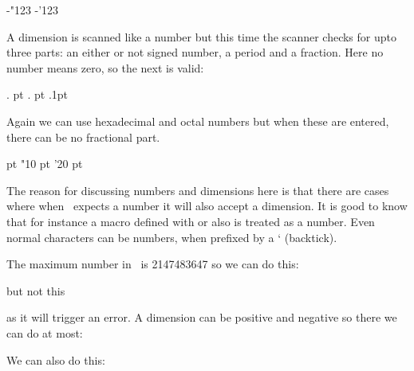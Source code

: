 \startbuffer
{}
\number -"123
\number -'123
\stopbuffer

\typebuffer[option=TEX]

\startlines \getbuffer \stoplines

A dimension is scanned like a number but this time the scanner checks for upto
three parts: an either or not signed number, a period and a fraction. Here no
number means zero, so the next is valid:

\startbuffer
\the\dimexpr  . pt \relax
\the{}. pt \relax
\the\dimexpr  .1pt \relax
\the\dimexpr 1.1pt \relax
\stopbuffer

\typebuffer[option=TEX]

\startlines \getbuffer \stoplines

Again we can use hexadecimal and octal numbers but when these are entered, there
can be no fractional part.

\startbuffer
\the{} pt \relax
\the\dimexpr "10 pt \relax
\the\dimexpr '20 pt \relax
\stopbuffer

\typebuffer[option=TEX]

\startlines \getbuffer \stoplines

The reason for discussing numbers and dimensions here is that there are cases where
when \TEX\ expects a number it will also accept a dimension. It is good to know that
for instance a macro defined with \type {\chardef} or \type {\mathchardef} also is
treated as a number. Even normal characters can be numbers, when prefixed by a \type
{`} (backtick).

The maximum number in \TEX\ is 2147483647 so we can do this:

\starttyping[option=TEX]
\stoptyping

but not this

\starttyping[option=TEX]
\stoptyping

as it will trigger an error. A dimension can be positive and negative so there we
can do at most:

\starttyping[option=TEX]
\scratchdimen  1073741823sp
\stoptyping

\startbuffer
{}
\number\scratchdimen
\the\scratchdimen
{}
\number\scratchdimen
\the\scratchdimen
\stopbuffer

\typebuffer[option=TEX]

\startlines
\getbuffer
\stoplines

We can also do this:

